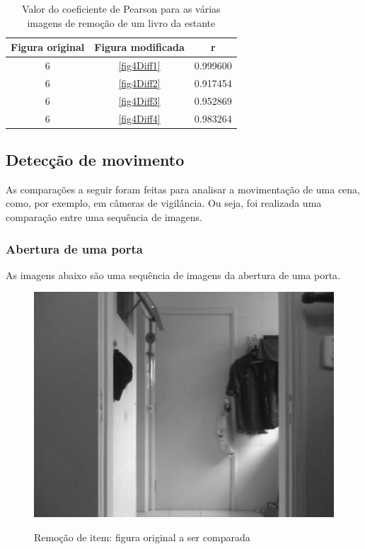 \documentclass[10pt,a4paper]{article}
\begin{document}
\vspace{-1.0cm}
\begin{table}[h!]
  \begin{center}
    \caption{Valor do coeficiente de Pearson para as várias imagens de
      remoção de um livro da estante}
    \begin{tabular}{|c|c|c|}
      \hline
      Figura original & Figura modificada & r\\
      \hline
      6 &  \ref{fig4Diff1} & 0.999600\\
      6 &  \ref{fig4Diff2} &  0.917454\\
      6 &  \ref{fig4Diff3} &   0.952869\\
      6 &  \ref{fig4Diff4} &   0.983264\\
      \hline
    \end{tabular}\label{tab:livro}
  \end{center}
\end{table}


\newpage
\subsection{Detecção de movimento}
As comparações a seguir foram feitas para analisar a movimentação de uma cena, como, por exemplo, em câmeras de
vigilância. Ou seja, foi realizada uma comparação entre uma sequência de imagens.

\subsubsection{Abertura de uma porta}
As imagens abaixo são uma sequência de imagens da
abertura de uma porta.

\begin{figure}[h!]
\begin{center}
\includegraphics[scale=0.35]{photos/porta/gBase} \label{porta}
\caption{Remoção de item: figura original a ser comparada}
\end{center}
\end{figure}
\end{document}
